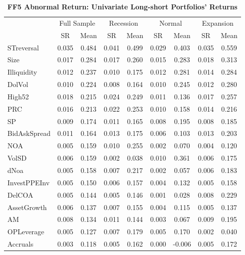 \begin{table}[H]
  \centering
  \footnotesize
  \caption{\textbf{FF5 Abnormal Return: Univariate Long-short Portfolios' Returns}}
  \label{table: ff5 univariate ls portfolio}
  \begin{tabular}{lcc|cc|cc|cc}
  \hline
      ~ & \multicolumn{2}{c}{Full Sample} & \multicolumn{2}{c}{Recession} & \multicolumn{2}{c}{Normal} & \multicolumn{2}{c}{Expansion} \\
      ~ & SR & Mean & SR & Mean & SR & Mean & SR & Mean \\ \hline
      STreversal & 0.035 & 0.484 & 0.041 & 0.499 & 0.029 & 0.403 & 0.035 & 0.559 \\
      Size & 0.017 & 0.284 & 0.017 & 0.260 & 0.015 & 0.283 & 0.018 & 0.313 \\ 
      Illiquidity & 0.012 & 0.237 & 0.010 & 0.175 & 0.012 & 0.281 & 0.014 & 0.284 \\ 
      DolVol & 0.010 & 0.224 & 0.008 & 0.164 & 0.010 & 0.245 & 0.012 & 0.280 \\ 
      High52 & 0.018 & 0.215 & 0.024 & 0.249 & 0.011 & 0.136 & 0.017 & 0.257 \\ 
      PRC & 0.016 & 0.213 & 0.022 & 0.253 & 0.010 & 0.158 & 0.014 & 0.216 \\ 
      SP & 0.009 & 0.174 & 0.011 & 0.165 & 0.008 & 0.195 & 0.008 & 0.185 \\ 
      BidAskSpread & 0.011 & 0.164 & 0.013 & 0.175 & 0.006 & 0.103 & 0.013 & 0.203 \\ 
      NOA & 0.005 & 0.159 & 0.010 & 0.255 & 0.002 & 0.070 & 0.004 & 0.120 \\ 
      VolSD & 0.006 & 0.159 & 0.002 & 0.038 & 0.010 & 0.361 & 0.006 & 0.175 \\ 
      dNoa & 0.005 & 0.158 & 0.007 & 0.217 & 0.002 & 0.057 & 0.006 & 0.183 \\ 
      InvestPPEInv & 0.005 & 0.150 & 0.006 & 0.157 & 0.004 & 0.132 & 0.005 & 0.158 \\ 
      DelCOA & 0.005 & 0.144 & 0.005 & 0.146 & 0.001 & 0.028 & 0.008 & 0.229 \\ 
      AssetGrowth & 0.006 & 0.137 & 0.007 & 0.155 & 0.004 & 0.115 & 0.005 & 0.137 \\ 
      AM & 0.008 & 0.134 & 0.011 & 0.144 & 0.003 & 0.067 & 0.009 & 0.195 \\ 
      OPLeverage & 0.005 & 0.127 & 0.007 & 0.179 & 0.005 & 0.170 & 0.002 & 0.040 \\ 
      Accruals & 0.003 & 0.118 & 0.005 & 0.162 & 0.000 & -0.006 & 0.005 & 0.172 \\ 

\end{tabular}
\end{table}
